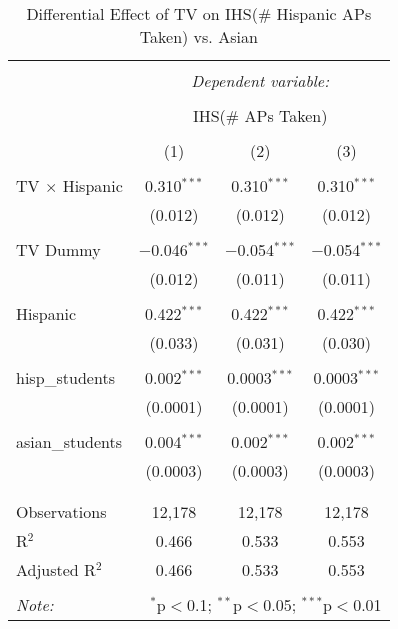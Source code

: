 
\begin{table}[!htbp] \centering 
  \caption{Differential Effect of TV on IHS(\# Hispanic APs Taken) vs. Asian} 
  \label{} 
\begin{tabular}{@{\extracolsep{-2pt}}lccc} 
\\[-1.8ex]\hline 
\hline \\[-1.8ex] 
 & \multicolumn{3}{c}{\textit{Dependent variable:}} \\ 
\cline{2-4} 
\\[-1.8ex] & \multicolumn{3}{c}{IHS(\# APs Taken)} \\ 
\\[-1.8ex] & (1) & (2) & (3)\\ 
\hline \\[-1.8ex] 
 TV $\times$ Hispanic & 0.310$^{***}$ & 0.310$^{***}$ & 0.310$^{***}$ \\ 
  & (0.012) & (0.012) & (0.012) \\ 
  & & & \\ 
 TV Dummy & $-$0.046$^{***}$ & $-$0.054$^{***}$ & $-$0.054$^{***}$ \\ 
  & (0.012) & (0.011) & (0.011) \\ 
  & & & \\ 
 Hispanic & 0.422$^{***}$ & 0.422$^{***}$ & 0.422$^{***}$ \\ 
  & (0.033) & (0.031) & (0.030) \\ 
  & & & \\ 
 hisp\_students & 0.002$^{***}$ & 0.0003$^{***}$ & 0.0003$^{***}$ \\ 
  & (0.0001) & (0.0001) & (0.0001) \\ 
  & & & \\ 
 asian\_students & 0.004$^{***}$ & 0.002$^{***}$ & 0.002$^{***}$ \\ 
  & (0.0003) & (0.0003) & (0.0003) \\ 
  & & & \\ 
\hline \\[-1.8ex] 
Observations & 12,178 & 12,178 & 12,178 \\ 
R$^{2}$ & 0.466 & 0.533 & 0.553 \\ 
Adjusted R$^{2}$ & 0.466 & 0.533 & 0.553 \\ 
\hline 
\hline \\[-1.8ex] 
\textit{Note:}  & \multicolumn{3}{r}{$^{*}$p$<$0.1; $^{**}$p$<$0.05; $^{***}$p$<$0.01} \\ 
\end{tabular} 
\end{table} 
